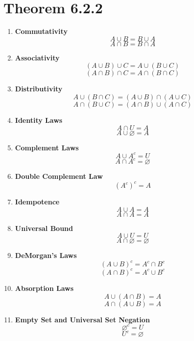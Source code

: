 \documentclass[12pt]{article}
\begin{document}
\section{Theorem 6.2.2}
\begin{enumerate}

    \item \textbf{Commutativity}
    \[
    A \cup B = B \cup A
    \]
    \[
    A \cap B = B \cap A
    \]

    \item \textbf{Associativity}
    \[
    (A \cup B) \cup C = A \cup (B \cup C)
    \]
    \[
    (A \cap B) \cap C = A \cap (B \cap C)
    \]

    \item \textbf{Distributivity}
    \[
    A \cup (B \cap C) = (A \cup B) \cap (A \cup C)
    \]
    \[
    A \cap (B \cup C) = (A \cap B) \cup (A \cap C)
    \]

    \item \textbf{Identity Laws}
    \[
    A \cap U = A
    \]
    \[
    A \cup \varnothing = A
    \]

    \item \textbf{Complement Laws}
    \[
    A \cup A^c = U
    \]
    \[
    A \cap A^c = \varnothing
    \]

    \item \textbf{Double Complement Law}
    \[
    (A^c)^c = A
    \]

    \item \textbf{Idempotence}
    \[
    A \cup A = A
    \]
    \[
    A \cap A = A
    \]

    \item \textbf{Universal Bound}
    \[
    A \cup U = U
    \]
    \[
    A \cap \varnothing = \varnothing
    \]

    \item \textbf{DeMorgan's Laws}
    \[
    (A \cup B)^c = A^c \cap B^c
    \]
    \[
    (A \cap B)^c = A^c \cup B^c
    \]

    \item \textbf{Absorption Laws}
    \[
    A \cup (A \cap B) = A
    \]
    \[
    A \cap (A \cup B) = A
    \]

    \item \textbf{Empty Set and Universal Set Negation}
    \[
    \varnothing^c = U
    \]
    \[
    U^c = \varnothing
    \]
 
\end{enumerate}
\end{document}
